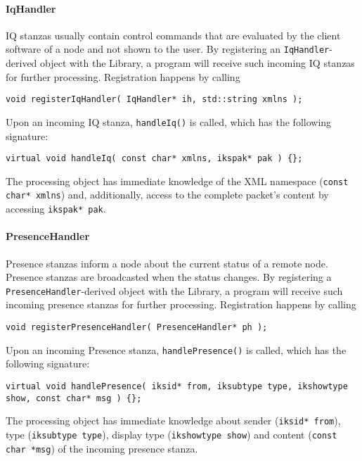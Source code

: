 \paragraph{IqHandler}
IQ stanzas usually contain control commands that are evaluated by the client software of a node and not shown to the user. By registering an \texttt{IqHandler}-derived object with the Library, a program will receive such incoming IQ stanzas for further processing. Registration happens by calling
\begin{flushleft}
\texttt{void registerIqHandler( IqHandler* ih, std::string xmlns );}
\end{flushleft}
Upon an incoming IQ stanza, \texttt{handleIq()} is called, which has the following signature:
\begin{flushleft}
\texttt{virtual void handleIq( const char* xmlns, ikspak* pak ) \{\};}
\end{flushleft}
The processing object has immediate knowledge of the XML namespace (\texttt{const char* xmlns}) and, additionally, access to the complete packet's content by accessing \texttt{ikspak* pak}.

\paragraph{PresenceHandler}
Presence stanzas inform a node about the current status of a remote node. Presence stanzas are broadcasted when the status changes. By registering a \texttt{PresenceHandler}-derived object with the Library, a program will receive such incoming presence stanzas for further processing. Registration happens by calling
\begin{flushleft}
\texttt{void registerPresenceHandler( PresenceHandler* ph );}
\end{flushleft}
Upon an incoming Presence stanza, \texttt{handlePresence()} is called, which has the following signature:
\begin{flushleft}
\texttt{virtual void handlePresence( iksid* from, iksubtype type, ikshowtype show, const char* msg ) \{\};}
\end{flushleft}
The processing object has immediate knowledge about sender (\texttt{iksid* from}), type (\texttt{iksubtype type}), display type (\texttt{ikshowtype show}) and content (\texttt{const char *msg}) of the incoming presence stanza.

